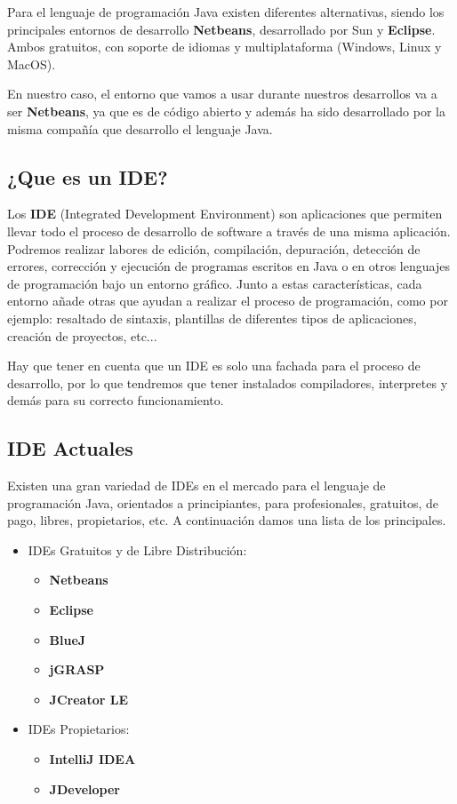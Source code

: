 Para el lenguaje de programación Java existen diferentes alternativas, siendo los principales entornos de desarrollo \textbf{Netbeans}, desarrollado por Sun y \textbf{Eclipse}. Ambos gratuitos, con soporte de idiomas y multiplataforma (Windows, Linux y MacOS).

En nuestro caso, el entorno que vamos a usar durante nuestros desarrollos va a ser \textbf{Netbeans}, ya que es de código abierto y además ha sido desarrollado por la misma compañía que desarrollo el lenguaje Java.

\subsection{¿Que es un IDE?}
Los \textbf{IDE} (Integrated Development Environment) son aplicaciones que permiten llevar todo el proceso de desarrollo de software a través de una misma aplicación. Podremos realizar labores de edición, compilación, depuración, detección de errores, corrección y ejecución de programas escritos en Java o en otros lenguajes de programación bajo un entorno gráfico. Junto a estas características, cada entorno añade otras que ayudan a realizar el proceso de programación, como por ejemplo: resaltado de sintaxis, plantillas de diferentes tipos de aplicaciones, creación de proyectos, etc...

Hay que tener en cuenta que un IDE es solo una fachada para el proceso de desarrollo, por lo que tendremos que tener instalados compiladores, interpretes y demás para su correcto funcionamiento.

\subsection{IDE Actuales}
Existen una gran variedad de IDEs en el mercado para el lenguaje de programación Java, orientados a principiantes, para profesionales, gratuitos, de pago, libres, propietarios, etc. A continuación damos una lista de los principales.

\begin{itemize}
    \item IDEs Gratuitos y de Libre Distribución:
    \begin{itemize}
        \item \textbf{Netbeans}
        \item \textbf{Eclipse}
        \item \textbf{BlueJ}
        \item \textbf{jGRASP}
        \item \textbf{JCreator LE}
    \end{itemize}

    \item IDEs Propietarios:
    \begin{itemize}
        \item \textbf{IntelliJ IDEA}
        \item \textbf{JDeveloper}
    \end{itemize}
\end{itemize}

